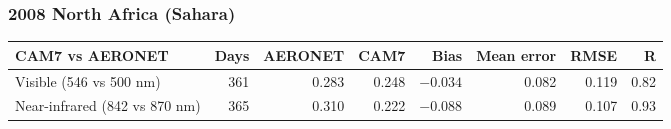 \begin{frame}[t]
\frametitle{2008 North Africa (Sahara)}
\centering
{}\hfill
{}\par
\vspace{0.15cm}
\hfill
{}\par
\vspace{0.1cm}
{\tiny\setlength{\tabcolsep}{5pt}
\begin{tabular}{@{}lrrrrrrr@{}}
\toprule
CAM7 vs AERONET & Days & AERONET & CAM7 & Bias & Mean error & RMSE & R \\
\midrule
Visible (546 vs 500 nm) & 361 & 0.283 & 0.248 & $-0.034$ & 0.082 & 0.119 & 0.82 \\
Near-infrared (842 vs 870 nm) & 365 & 0.310 & 0.222 & $-0.088$ & 0.089 & 0.107 & 0.93 \\
\bottomrule
\end{tabular}\par}
\end{frame}
